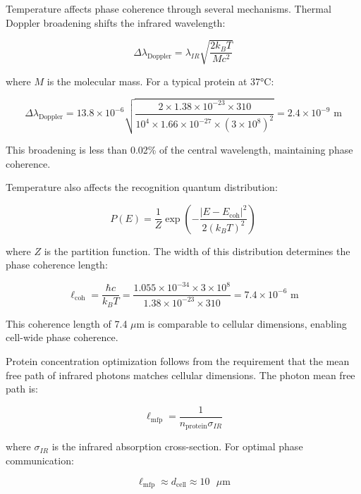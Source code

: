 \documentclass[12pt,a4paper]{report}
\begin{document}
Temperature affects phase coherence through several mechanisms. Thermal Doppler broadening shifts the infrared wavelength:

\begin{equation}
\Delta\lambda_{\text{Doppler}} = \lambda_{IR} \sqrt{\frac{2k_B T}{M c^2}}
\end{equation}

where $M$ is the molecular mass. For a typical protein at 37°C:

\begin{equation}
\Delta\lambda_{\text{Doppler}} = 13.8 \times 10^{-6} \sqrt{\frac{2 \times 1.38 \times 10^{-23} \times 310}{10^4 \times 1.66 \times 10^{-27} \times (3 \times 10^8)^2}} = 2.4 \times 10^{-9} \text{ m}
\end{equation}

This broadening is less than 0.02\% of the central wavelength, maintaining phase coherence.

Temperature also affects the recognition quantum distribution:

\begin{equation}
P(E) = \frac{1}{Z} \exp\left(-\frac{|E - E_{\text{coh}}|^2}{2(k_B T)^2}\right)
\end{equation}

where $Z$ is the partition function. The width of this distribution determines the phase coherence length:

\begin{equation}
\ell_{\text{coh}} = \frac{\hbar c}{k_B T} = \frac{1.055 \times 10^{-34} \times 3 \times 10^8}{1.38 \times 10^{-23} \times 310} = 7.4 \times 10^{-6} \text{ m}
\end{equation}

This coherence length of 7.4 $\mu$m is comparable to cellular dimensions, enabling cell-wide phase coherence.

Protein concentration optimization follows from the requirement that the mean free path of infrared photons matches cellular dimensions. The photon mean free path is:

\begin{equation}
\ell_{\text{mfp}} = \frac{1}{n_{\text{protein}} \sigma_{IR}}
\end{equation}

where $\sigma_{IR}$ is the infrared absorption cross-section. For optimal phase communication:

\begin{equation}
\ell_{\text{mfp}} \approx d_{\text{cell}} \approx 10 \text{ $\mu$m}
\end{equation}
\end{document}
